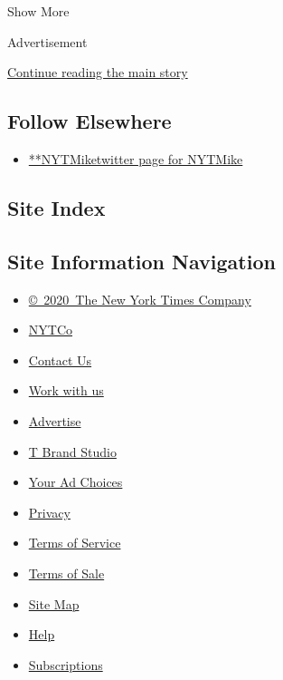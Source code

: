 Show More

Advertisement

\protect\hyperlink{after-mid2}{Continue reading the main story}

\hypertarget{follow-elsewhere}{%
\subsection{Follow Elsewhere}\label{follow-elsewhere}}

\begin{itemize}
\tightlist
\item
  \href{https://twitter.com/NYTMike}{**NYTMiketwitter page for NYTMike}
\end{itemize}

\hypertarget{site-index}{%
\subsection{Site Index}\label{site-index}}

\hypertarget{site-information-navigation}{%
\subsection{Site Information
Navigation}\label{site-information-navigation}}

\begin{itemize}
\tightlist
\item
  \href{https://help.nytimes.com/hc/en-us/articles/115014792127-Copyright-notice}{©~2020~The
  New York Times Company}
\end{itemize}

\begin{itemize}
\tightlist
\item
  \href{https://www.nytco.com/}{NYTCo}
\item
  \href{https://help.nytimes.com/hc/en-us/articles/115015385887-Contact-Us}{Contact
  Us}
\item
  \href{https://www.nytco.com/careers/}{Work with us}
\item
  \href{https://nytmediakit.com/}{Advertise}
\item
  \href{http://www.tbrandstudio.com/}{T Brand Studio}
\item
  \href{https://www.nytimes.com/privacy/cookie-policy\#how-do-i-manage-trackers}{Your
  Ad Choices}
\item
  \href{https://www.nytimes.com/privacy}{Privacy}
\item
  \href{https://help.nytimes.com/hc/en-us/articles/115014893428-Terms-of-service}{Terms
  of Service}
\item
  \href{https://help.nytimes.com/hc/en-us/articles/115014893968-Terms-of-sale}{Terms
  of Sale}
\item
  \href{https://spiderbites.nytimes.com}{Site Map}
\item
  \href{https://help.nytimes.com/hc/en-us}{Help}
\item
  \href{https://www.nytimes.com/subscription?campaignId=37WXW}{Subscriptions}
\end{itemize}
